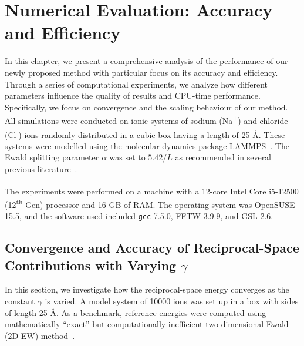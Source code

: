 \chapter{Numerical Evaluation: Accuracy and Efficiency}
\label{Chapter4}

In this chapter, we present a comprehensive analysis of the performance of our newly proposed method with particular focus on its accuracy and efficiency. Through a series of computational experiments, we analyze how different parameters influence the quality of results and CPU-time performance. Specifically, we focus on convergence and the scaling behaviour of our method. All simulations were conducted on ionic systems of sodium (Na\textsuperscript{+}) and chloride (Cl\textsuperscript{-}) ions randomly distributed in a cubic box having a length of 25 \AA. These systems were modelled using the molecular dynamics package LAMMPS~\cite{LAMMPS}. The Ewald splitting parameter $\alpha$ was set to $5.42/L$ as recommended in several previous literature~\cite{frenkel2002understanding}.

The experiments were performed on a machine with a 12-core Intel\textsuperscript{\textregistered} Core\texttrademark{} i5-12500 (12\textsuperscript{th} Gen) processor and 16 GB of RAM. The operating system was OpenSUSE 15.5, and the software used included \texttt{gcc} 7.5.0, FFTW 3.9.9, and GSL 2.6.
\section{Convergence and Accuracy of Reciprocal-Space Contributions with Varying $\gamma$}
In this section, we investigate how the reciprocal-space energy converges as the constant $\gamma$ is varied. A model system of 10000 ions was set up in a box with sides of length 25 \AA. As a benchmark, reference energies were computed using mathematically ``exact'' but computationally inefficient two-dimensional Ewald (2D-EW) method~\cite{kawata2001rapid}.

